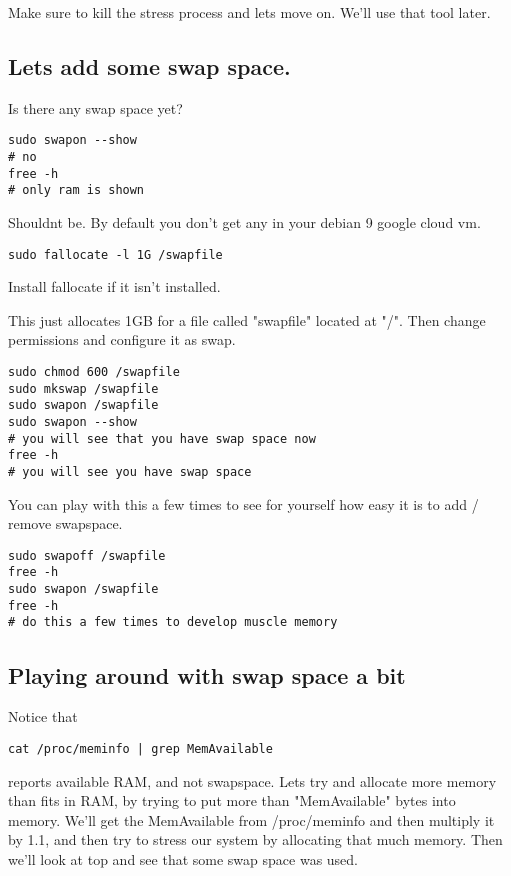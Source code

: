 \documentclass[10pt]{article}
\begin{document}
Make sure to kill the stress process and lets move on. We'll use that tool
later.

\subsection{ Lets add some swap space.}
Is there any swap space yet?

\begin{lstlisting}
sudo swapon --show
# no
free -h
# only ram is shown
\end{lstlisting}

Shouldnt be. By default you don't get any in your debian 9 google cloud vm.


\begin{lstlisting}
sudo fallocate -l 1G /swapfile
\end{lstlisting}

Install fallocate if it isn't installed.

This just allocates 1GB for a file called "swapfile" located at "/". Then change
permissions and configure it as swap.

\begin{lstlisting}
sudo chmod 600 /swapfile
sudo mkswap /swapfile
sudo swapon /swapfile
sudo swapon --show 
# you will see that you have swap space now
free -h
# you will see you have swap space
\end{lstlisting}

You can play with this a few times to see for yourself how easy it is to add /
remove swapspace.

\begin{lstlisting}
sudo swapoff /swapfile
free -h
sudo swapon /swapfile
free -h
# do this a few times to develop muscle memory
\end{lstlisting}


\subsection{Playing around with swap space a bit}

Notice that

\begin{lstlisting}
cat /proc/meminfo | grep MemAvailable 
\end{lstlisting}

reports available RAM, and not swapspace. Lets try and allocate more memory than
fits in RAM, by trying to put more than "MemAvailable" bytes into memory. We'll
get the MemAvailable from /proc/meminfo and then multiply it by 1.1, and then
try to stress our system by allocating that much memory. Then we'll look at top
and see that some swap space was used.
\end{document}
